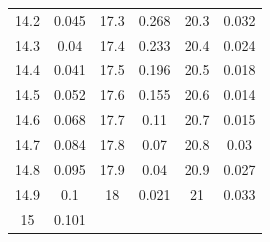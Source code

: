 \documentclass[12pt]{report}
\begin{document}
\begin{center}
\begin{tabular}{ |c|c|c|c|c|c| }
14.2 & 0.045 & 17.3 & 0.268 & 20.3 & 0.032 \\
14.3 & 0.04  & 17.4 & 0.233 & 20.4 & 0.024 \\
14.4 & 0.041 & 17.5 & 0.196 & 20.5 & 0.018 \\
14.5 & 0.052 & 17.6 & 0.155 & 20.6 & 0.014 \\
14.6 & 0.068 & 17.7 & 0.11  & 20.7 & 0.015 \\
14.7 & 0.084 & 17.8 & 0.07  & 20.8 & 0.03  \\
14.8 & 0.095 & 17.9 & 0.04  & 20.9 & 0.027 \\
14.9 & 0.1   & 18   & 0.021 & 21   & 0.033 \\
15   & 0.101 &      &       &      &       \\
	\hline
\end{tabular}
\\
\end{center}
\end{document}

